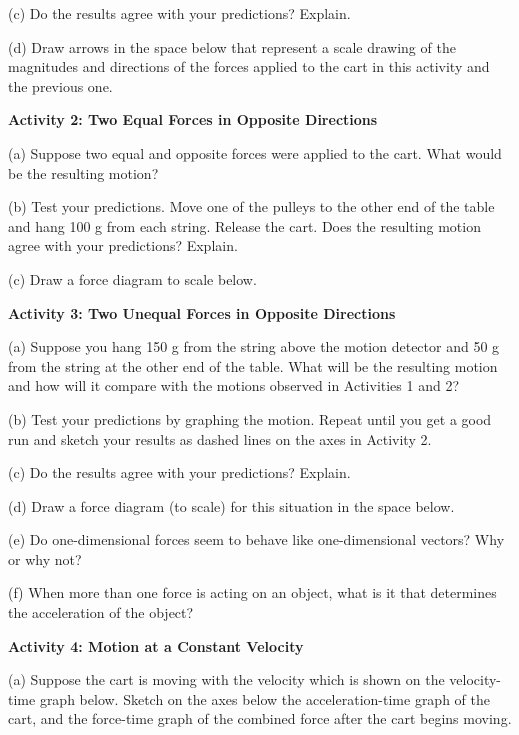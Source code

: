 (c) Do the results agree with your predictions? Explain.
\vspace{20mm}

(d) Draw arrows in the space below that represent a scale drawing of the magnitudes
and directions of the forces applied to the cart in this activity and the previous
one.
\vspace{20mm}

\textbf{Activity 2: Two Equal Forces in Opposite Directions}

(a) Suppose two equal and opposite forces were applied to the cart. What would
be the resulting motion?
\vspace{10mm}

(b) Test your predictions. Move one of the pulleys to the other end of the table
and hang 100 g from each string. Release the cart. Does the resulting motion
agree with your predictions? Explain.
\vspace{20mm}

(c) Draw a force diagram to scale below.
\vspace{10mm}

\textbf{Activity 3: Two Unequal Forces in Opposite Directions}

(a) Suppose you hang 150 g from the string above the motion detector and 50
g from the string at the other end of the table. What will be the resulting
motion and how will it compare with the motions observed in Activities 1 and
2?
\vspace{20mm}

(b) Test your predictions by graphing the motion. Repeat until you get a good
run and sketch your results as dashed lines on the axes in Activity 2.

(c) Do the results agree with your predictions? Explain.
\vspace{20mm}

(d) Draw a force diagram (to scale) for this situation in the space below.
\vspace{10mm}

(e) Do one-dimensional forces seem to behave like one-dimensional vectors? Why
or why not?
\vspace{20mm}

(f) When more than one force is acting on an object, what is it that determines
the acceleration of the object?
\vspace{20mm}

\textbf{Activity 4: Motion at a Constant Velocity}

(a) Suppose the cart is moving with the velocity which is shown on the velocity-time
graph below. Sketch on the axes below the acceleration-time graph of the cart,
and the force-time graph of the combined force after the cart begins moving.

